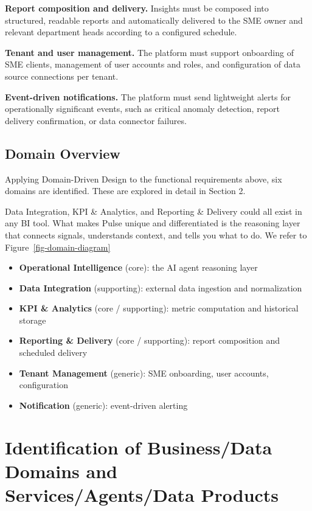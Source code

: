 \documentclass[
  letterpaper,
  DIV=11,
  numbers=noendperiod]{scrartcl}
\begin{document}
\textbf{Report composition and delivery.} Insights must be composed into
structured, readable reports and automatically delivered to the SME
owner and relevant department heads according to a configured schedule.

\textbf{Tenant and user management.} The platform must support
onboarding of SME clients, management of user accounts and roles, and
configuration of data source connections per tenant.

\textbf{Event-driven notifications.} The platform must send lightweight
alerts for operationally significant events, such as critical anomaly
detection, report delivery confirmation, or data connector failures.

\subsection{\texorpdfstring{\textbf{Domain
Overview}}{Domain Overview}}\label{domain-overview}

Applying Domain-Driven Design to the functional requirements above, six
domains are identified. These are explored in detail in Section 2.

Data Integration, KPI \& Analytics, and Reporting \& Delivery could all
exist in any BI tool. What makes Pulse unique and differentiated is the
reasoning layer that connects signals, understands context, and tells
you what to do. We refer to Figure~\ref{fig-domain-diagram}

\begin{itemize}
\item
  \textbf{Operational Intelligence} (core): the AI agent reasoning layer
\item
  \textbf{Data Integration} (supporting): external data ingestion and
  normalization
\item
  \textbf{KPI \& Analytics} (core / supporting): metric computation and
  historical storage
\item
  \textbf{Reporting \& Delivery} (core / supporting): report composition
  and scheduled delivery
\item
  \textbf{Tenant Management} (generic): SME onboarding, user accounts,
  configuration
\item
  \textbf{Notification} (generic): event-driven alerting
\end{itemize}

\section{Identification of Business/Data Domains and
Services/Agents/Data
Products}\label{identification-of-businessdata-domains-and-servicesagentsdata-products}
\end{document}
